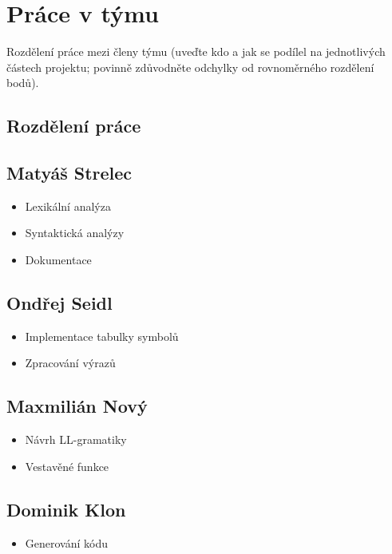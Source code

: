 \documentclass[11pt,a4paper]{article}
\begin{document}
    \section{Práce v týmu}
    Rozdělení práce mezi členy týmu (uveďte kdo a jak se podílel na jednotlivých
    částech projektu; povinně zdůvodněte odchylky od rovnoměrného rozdělení bodů).
    
    \subsection{Rozdělení práce}

    \subsection*{Matyáš Strelec}
    \begin{itemize}
        \item Lexikální analýza
        \item Syntaktická analýzy
        \item Dokumentace
    \end{itemize}

    \subsection*{Ondřej Seidl}
    \begin{itemize}
        \item Implementace tabulky symbolů
        \item Zpracování výrazů
    \end{itemize}

    \subsection*{Maxmilián Nový}
    \begin{itemize}
        \item Návrh LL-gramatiky
        \item Vestavěné funkce
    \end{itemize}

    \subsection*{Dominik Klon}
    \begin{itemize}
        \item Generování kódu
    \end{itemize}
\end{document}
